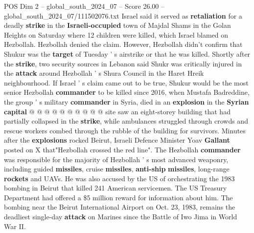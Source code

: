 \begin{textsample}{POS Dim 2 – global\_south\_2024\_07 – Score 26.00 – global\_south\_2024\_07/111502076.txt}
Israel said it served as \textbf{retaliation} for a deadly \textbf{strike} in the \textbf{Israeli-occupied} town of Majdal Shams in the Golan Heights on Saturday where 12 children were killed, which Israel blamed on Hezbollah.
Hezbollah denied the claim.
However, Hezbollah didn't confirm that Shukur was the \textbf{target} of Tuesday ' s airstrike or that he was killed.
Shortly after the \textbf{strike}, two security sources in Lebanon said Shukr was critically injured in the \textbf{attack} around Hezbollah ' s Shura Council in the Haret Hreik neighbourhood.
If Israel ' s claim came out to be true, Shukur would be the most senior Hezbollah \textbf{commander} to be killed since 2016, when Mustafa Badreddine, the group ' s military \textbf{commander} in Syria, died in an \textbf{explosion} in the \textbf{Syrian} \textbf{capital} @ @ @ @ @ @ @ @ @ @ site saw an eight-storey building that had partially collapsed in the \textbf{strike}, while ambulances struggled through crowds and rescue workers combed through the rubble of the building for survivors.
Minutes after the \textbf{explosions} rocked Beirut, Israeli Defence Minister Yoav \textbf{Gallant} posted on X that"Hezbollah crossed the red line".
The Hezbollah \textbf{commander} was responsible for the majority of Hezbollah ' s most advanced weaponry, including guided \textbf{missiles}, cruise \textbf{missiles}, \textbf{anti-ship} \textbf{missiles}, long-range \textbf{rockets} and UAVs.
He was also accused by the US of orchestrating the 1983 bombing in Beirut that killed 241 American servicemen.
The US Treasury Department had offered a \$5 million reward for information about him.
The bombing near the Beirut International Airport on Oct. 23, 1983, remains the deadliest single-day \textbf{attack} on Marines since the Battle of Iwo Jima in World War II.

\end{textsample}

